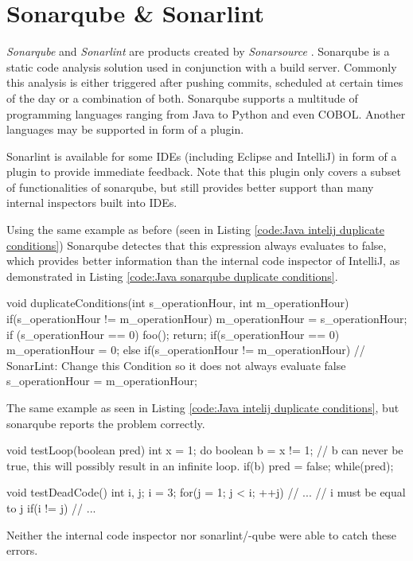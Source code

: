 \section{Sonarqube \& Sonarlint} %
\label{sec:sonar}
\emph{Sonarqube} \cite{sonarqube} and \emph{Sonarlint} \cite{SonarLintFixIssues} are products created by \emph{Sonarsource} \cite{CodeQualityCode}. Sonarqube is a static code analysis solution used in conjunction with a build server.
Commonly this analysis is either triggered after pushing commits, scheduled at certain times of the day or a combination of both.
Sonarqube supports a multitude of programming languages ranging from Java to Python and even COBOL. Another languages may be supported in form of a plugin.


Sonarlint is available for some IDEs (including Eclipse and IntelliJ) in form of a plugin to provide immediate feedback. Note that this plugin only covers a subset of functionalities of sonarqube, but still provides better support than many internal inspectors built into IDEs.


Using the same example as before (seen in Listing \ref{code:Java intelij duplicate conditions}) Sonarqube detectes that this expression always evaluates to false, which provides better information than the internal code inspector of IntelliJ, as demonstrated in Listing \ref{code:Java sonarqube duplicate conditions}.

\begin{program}
	\begin{JavaCode}
void duplicateConditions(int s_operationHour, int m_operationHour) {
	if(s_operationHour != m_operationHour) {
		m_operationHour = s_operationHour;
		if (s_operationHour == 0) {
			foo();        
		}
		return;
	}
	if(s_operationHour == 0) {
		m_operationHour = 0;
	} else {
		if(s_operationHour != m_operationHour) { // SonarLint: Change this Condition so it does not always evaluate false
			s_operationHour = m_operationHour;
		}
	}
}\end{JavaCode}
	\caption{The same example as seen in Listing \ref{code:Java intelij duplicate conditions}, but sonarqube reports the problem correctly. }
	\label{code:Java sonarqube duplicate conditions}
\end{program}

\begin{program}
	\begin{JavaCode}
void testLoop(boolean pred) {
	int x = 1;
	do {
		boolean b = x != 1;
		// b can never be true, this will possibly result in an infinite loop.
		if(b) {
			pred = false;
		}
	} while(pred);
}

void testDeadCode() {
	int i, j;
	i = 3;
	for(j = 1; j < i; ++j) {
		// ...
	}
	// i must be equal to j
	if(i != j) { 
		// ...
	}
}\end{JavaCode}
	\caption{Neither the internal code inspector nor sonarlint/-qube were able to catch these errors. }
	\label{code:Java sonarqube hard example}
\end{program}

